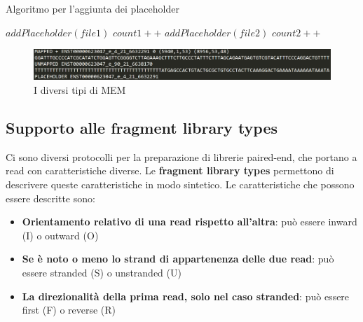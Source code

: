 \newpage

\begin{algorithm}
\caption{Algoritmo per l'aggiunta dei placeholder}\label{placeholder}
\begin{algorithmic}[1]
			\State $addPlaceholder(file1)$
			\State $count1++$
		\Else
			\State $addPlaceholder(file2)$
			\State $count2++$
		\EndIf
	\EndWhile\label{euclidendwhile}
\EndProcedure
\end{algorithmic}
\end{algorithm}

\begin{figure}
	\centering
	\includegraphics[width=\linewidth]{images/tipiMEM2.png}
  \caption{I diversi tipi di MEM}
  \label{fig:AlternativeSplicingTypes}
\end{figure}

\newpage

\subsection{Supporto alle fragment library types}
Ci sono diversi protocolli per la preparazione di librerie paired-end, che portano a read con caratteristiche diverse. Le \textbf{fragment library types} permettono di descrivere queste caratteristiche in modo sintetico. Le caratteristiche che possono essere descritte sono:
\begin{itemize}
	\item \textbf{Orientamento relativo di una read rispetto all'altra}: può essere inward (I) o outward (O)
	\item \textbf{Se è noto o meno lo strand di appartenenza delle due read}:  può essere stranded (S) o unstranded (U)
	\item \textbf{La direzionalità della prima read, solo nel caso stranded}: può essere first (F) o reverse (R)
\end{itemize}

